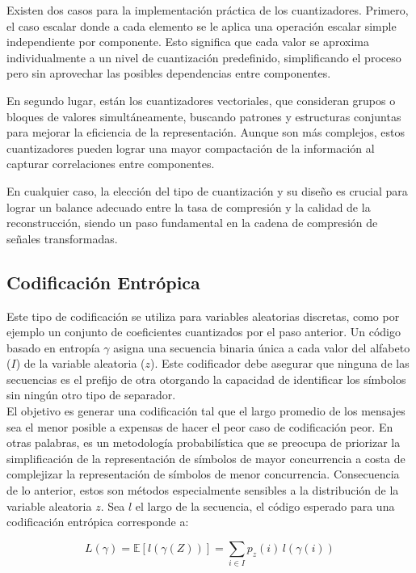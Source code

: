         Existen dos casos para la implementación práctica de los cuantizadores. Primero, el caso escalar donde a cada elemento se le aplica una operación escalar simple independiente por componente. Esto significa que cada valor se aproxima individualmente a un nivel de cuantización predefinido, simplificando el proceso pero sin aprovechar las posibles dependencias entre componentes.
        
        En segundo lugar, están los cuantizadores vectoriales, que consideran grupos o bloques de valores simultáneamente, buscando patrones y estructuras conjuntas para mejorar la eficiencia de la representación. Aunque son más complejos, estos cuantizadores pueden lograr una mayor compactación de la información al capturar correlaciones entre componentes.
        
        En cualquier caso, la elección del tipo de cuantización y su diseño es crucial para lograr un balance adecuado entre la tasa de compresión y la calidad de la reconstrucción, siendo un paso fundamental en la cadena de compresión de señales transformadas.
        

    \subsection{Codificación Entrópica}
        Este tipo de codificación se utiliza para variables aleatorias discretas, como por ejemplo un conjunto de coeficientes cuantizados por el paso anterior. Un código basado en entropía $\gamma$ asigna una secuencia binaria única a cada valor del alfabeto ($I$) de la variable aleatoria ($z$). Este codificador debe asegurar que ninguna de las secuencias es el prefijo de otra otorgando la capacidad de identificar los símbolos sin ningún otro tipo de separador.\\

        El objetivo es generar una codificación tal que el largo promedio de los mensajes sea el menor posible a expensas de hacer el peor caso de codificación peor. En otras palabras, es un metodología probabilística que se preocupa de priorizar la simplificación de la representación de símbolos de mayor concurrencia a costa de complejizar la representación de símbolos de menor concurrencia. Consecuencia de lo anterior, estos son métodos especialmente sensibles a la distribución de la variable aleatoria $z$. Sea $l$ el largo de la secuencia, el código esperado para una codificación entrópica corresponde a:

        \begin{equation}
            L(\gamma) = \mathbb{E}[l(\gamma(Z))] = \sum_{i \in I} p_z(i) \, l(\gamma(i))
        \end{equation}
            
